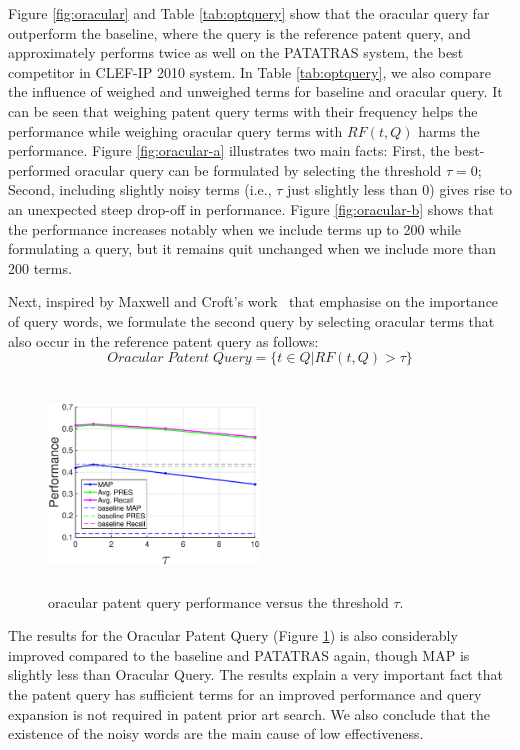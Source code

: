 Figure \ref{fig:oracular} and Table \ref{tab:optquery} show that the oracular query far outperform the baseline, where the query is the reference patent query, and approximately performs twice as well on the PATATRAS system, the best competitor in CLEF-IP 2010 system. In Table \ref{tab:optquery}, we also compare the influence of weighed and unweighed terms for baseline and oracular query. It can be seen that weighing patent query terms with their frequency helps the performance while weighing oracular query terms with $RF(t, Q)$ harms the performance.  Figure \ref{fig:oracular-a} illustrates two main facts: First, the best-performed oracular query can be formulated by selecting the threshold $\tau=0$; Second, including slightly noisy terms (i.e., $\tau$ just slightly less than 0) gives rise to an unexpected steep drop-off in performance. Figure \ref{fig:oracular-b} shows that the performance increases notably when we include terms up to 200 while formulating a query, but it remains quit unchanged when we include more than 200 terms. 

Next, inspired by Maxwell and Croft's work~\citep{maxwell2013compact} that emphasise on the importance of query words, we formulate the second query by selecting oracular terms that also occur in the reference patent query as follows:
\begin{equation}
 Oracular \; Patent \; Query = \{t\in Q|RF(t, Q)>\tau\}   
 \label{eq:score}
\end{equation}
\begin{figure}[t!]
   \centering
   \includegraphics[width=0.50\textwidth,height=55mm]{figs/oracularpq.eps}
   \caption{oracular patent query performance versus the threshold $\tau$.}   
   \label{fig:oracularpq} 
\end{figure}
The results for the Oracular Patent Query (Figure \ref{fig:oracularpq}) is also considerably improved compared to the baseline and PATATRAS again, though MAP is slightly less than Oracular Query. The results explain a very important fact that the patent query has sufficient terms for an improved performance and query expansion is not required in patent prior art search. We also conclude that the existence of the noisy words are the main cause of low effectiveness.  

